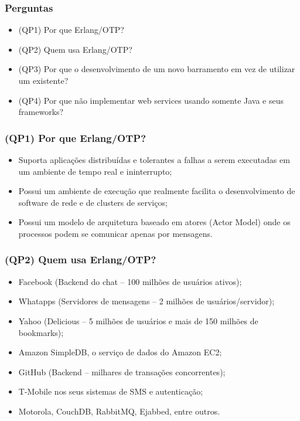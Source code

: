 \documentclass{beamer}
\begin{document}
\begin{frame}
  \frametitle{Perguntas}

  \begin{exampleblock}{}
  
	  \begin{itemize}
		\item<1->(QP1) Por que Erlang/OTP?
		\item<1->(QP2) Quem usa Erlang/OTP?
	    \item<1->(QP3) Por que o desenvolvimento de um novo barramento em vez de utilizar um existente?
	    \item<1->(QP4) Por que não implementar web services usando somente Java e seus frameworks?
	  \end{itemize}
  
  \end{exampleblock}

  
\end{frame}


\begin{frame}
  \frametitle{(QP1) Por que Erlang/OTP?}

    \begin{itemize}
       \item<1-> Suporta aplicações distribuídas e tolerantes a falhas a serem executadas em um ambiente de tempo real e ininterrupto;
       \item<1-> Possui um ambiente de execução que realmente facilita o desenvolvimento de software de rede e de clusters de serviços;
       
       \item<1-> Possui um modelo de arquitetura baseado em atores (Actor Model) onde os processos podem 
       se comunicar apenas por mensagens.
       
    \end{itemize}
  
\end{frame}


\begin{frame}
  \frametitle{(QP2) Quem usa Erlang/OTP?}

	  \begin{itemize}
		\item<1->Facebook (Backend do chat -- 100 milhões de usuários ativos);
		\item<1->Whatapps (Servidores de mensagens -- 2 milhões de usuários/servidor);
		\item<1->Yahoo (Delicious -- 5 milhões de usuários e mais de 150 milhões de bookmarks);
		\item<1->Amazon SimpleDB, o serviço de dados do Amazon EC2;
		\item<1->GitHub (Backend -- milhares de transações concorrentes);
		\item<1->T-Mobile nos seus sistemas de SMS e autenticação;
		\item<1->Motorola, CouchDB, RabbitMQ, Ejabbed, entre outros.
						
	   \end{itemize}
  
\end{frame}
\end{document}
